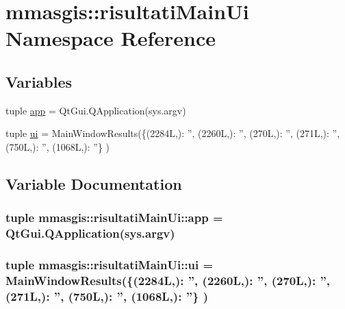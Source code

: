 \hypertarget{namespacemmasgis_1_1risultatiMainUi}{
\section{mmasgis::risultatiMainUi Namespace Reference}
\label{namespacemmasgis_1_1risultatiMainUi}
}
\subsection*{Variables}
\begin{DoxyCompactItemize}
\item 
tuple \hyperlink{namespacemmasgis_1_1risultatiMainUi_ada1bb6ab32e82009959336de2cfbbc63}{app} = QtGui.QApplication(sys.argv)
\item 
tuple \hyperlink{namespacemmasgis_1_1risultatiMainUi_a0c7dd6dfde60fd0b3ae45087e1f82265}{ui} = MainWindowResults(\{(2284L,): '', (2260L,): '', (270L,): '', (271L,): '', (750L,): '', (1068L,): ''\} )
\end{DoxyCompactItemize}


\subsection{Variable Documentation}
\hypertarget{namespacemmasgis_1_1risultatiMainUi_ada1bb6ab32e82009959336de2cfbbc63}{
\subsubsection[{app}]{\setlength{\rightskip}{0pt plus 5cm}tuple {\bf mmasgis::risultatiMainUi::app} = QtGui.QApplication(sys.argv)}}
\label{namespacemmasgis_1_1risultatiMainUi_ada1bb6ab32e82009959336de2cfbbc63}
\hypertarget{namespacemmasgis_1_1risultatiMainUi_a0c7dd6dfde60fd0b3ae45087e1f82265}{
\subsubsection[{ui}]{\setlength{\rightskip}{0pt plus 5cm}tuple {\bf mmasgis::risultatiMainUi::ui} = MainWindowResults(\{(2284L,): '', (2260L,): '', (270L,): '', (271L,): '', (750L,): '', (1068L,): ''\} )}}
\label{namespacemmasgis_1_1risultatiMainUi_a0c7dd6dfde60fd0b3ae45087e1f82265}
